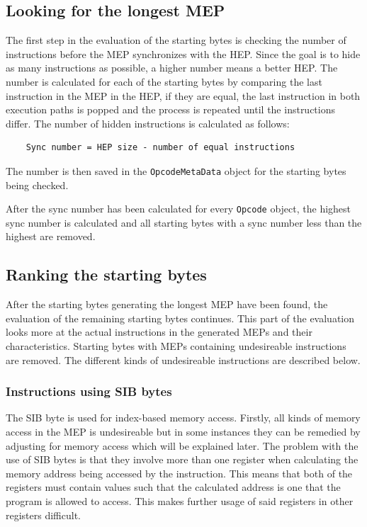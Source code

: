 \documentclass[11pt,twoside]{eitExjobb}
\begin{document}
\subsection{Looking for the longest MEP}
The first step in the evaluation of the starting bytes is checking the number of instructions before the MEP synchronizes with the HEP. Since the goal is to hide as many instructions as possible, a higher number means a better HEP. The number is calculated for each of the starting bytes by comparing the last instruction in the MEP in the HEP, if they are equal, the last instruction in both execution paths is popped and the process is repeated until the instructions differ. The number of hidden instructions is calculated as follows:

\begin{verbatim}
    Sync number = HEP size - number of equal instructions
\end{verbatim}

The number is then saved in the \texttt{OpcodeMetaData} object for the starting bytes being checked.

After the sync number has been calculated for every \texttt{Opcode} object, the highest sync number is calculated and all starting bytes with a sync number less than the highest are removed.


\subsection{Ranking the starting bytes}
After the starting bytes generating the longest MEP have been found, the evaluation of the remaining starting bytes continues. This part of the evaluation looks more at the actual instructions in the generated MEPs and their characteristics. Starting bytes with MEPs containing undesireable instructions are removed. The different kinds of undesireable instructions are described below.

\subsubsection{Instructions using SIB bytes}
The SIB byte is used for index-based memory access. Firstly, all kinds of memory access in the MEP is undesireable but in some instances they can be remedied by adjusting for memory access which will be explained later. The problem with the use of SIB bytes is that they involve more than one register when calculating the memory address being accessed by the instruction. This means that both of the registers must contain values such that the calculated address is one that the program is allowed to access. This makes further usage of said registers in other registers difficult.
\end{document}
